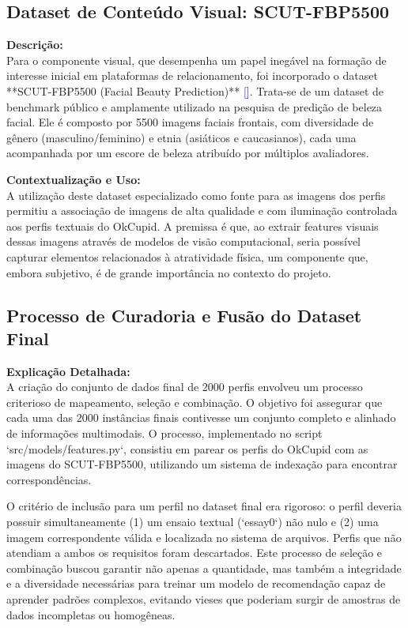 \subsection{Dataset de Conteúdo Visual: SCUT-FBP5500}
\textbf{Descrição:} \\
Para o componente visual, que desempenha um papel inegável na formação de interesse inicial em plataformas de relacionamento, foi incorporado o dataset **SCUT-FBP5500 (Facial Beauty Prediction)** \textcolor{blue}{[\cite{wang2018scut}]}. Trata-se de um dataset de benchmark público e amplamente utilizado na pesquisa de predição de beleza facial. Ele é composto por 5500 imagens faciais frontais, com diversidade de gênero (masculino/feminino) e etnia (asiáticos e caucasianos), cada uma acompanhada por um escore de beleza atribuído por múltiplos avaliadores.

\textbf{Contextualização e Uso:} \\
A utilização deste dataset especializado como fonte para as imagens dos perfis permitiu a associação de imagens de alta qualidade e com iluminação controlada aos perfis textuais do OkCupid. A premissa é que, ao extrair features visuais dessas imagens através de modelos de visão computacional, seria possível capturar elementos relacionados à atratividade física, um componente que, embora subjetivo, é de grande importância no contexto do projeto.

\subsection{Processo de Curadoria e Fusão do Dataset Final}
\textbf{Explicação Detalhada:} \\
A criação do conjunto de dados final de 2000 perfis envolveu um processo criterioso de mapeamento, seleção e combinação. O objetivo foi assegurar que cada uma das 2000 instâncias finais contivesse um conjunto completo e alinhado de informações multimodais. O processo, implementado no script `src/models/features.py`, consistiu em parear os perfis do OkCupid com as imagens do SCUT-FBP5500, utilizando um sistema de indexação para encontrar correspondências.

O critério de inclusão para um perfil no dataset final era rigoroso: o perfil deveria possuir simultaneamente (1) um ensaio textual (`essay0`) não nulo e (2) uma imagem correspondente válida e localizada no sistema de arquivos. Perfis que não atendiam a ambos os requisitos foram descartados. Este processo de seleção e combinação buscou garantir não apenas a quantidade, mas também a integridade e a diversidade necessárias para treinar um modelo de recomendação capaz de aprender padrões complexos, evitando vieses que poderiam surgir de amostras de dados incompletas ou homogêneas.